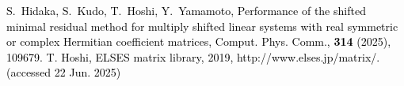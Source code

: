 


\textcolor{black}{
\fontsize{28pt}{15pt}\selectfont
\begin{thebibliography}{7}
	\vspace{-2mm}
		S.~Hidaka, S.~Kudo, T.~Hoshi, Y.~Yamamoto,
		Performance of the shifted minimal residual method for multiply shifted linear systems with real symmetric or complex Hermitian coefficient matrices,
		Comput. Phys. Comm., \textbf{314} (2025), 109679.
		T. Hoshi, ELSES matrix library, 2019, http://www.elses.jp/matrix/. (accessed 22 Jun. 2025)
\end{thebibliography}
}


\begin{comment}




	\bibitem{ref-SeitoH-2019}
		S.~Hiroaki, T.~Hoshi, and Y.~Yamamoto,
		\newblock On using the shifted minimal residual method for quantum-mechanical wave packet simulation,
		\newblock JSIAM Let., {\bf 11} (2019), 13--16.
	\bibitem{ref-SogabeT-2010}
		S.~Tomohiro et.al.,
		\newblock A fast numerical method for generalized shifted linear systems with complex symmetric matrices,
		\newblock 数理解析研究所講究録., {\bf 1719} (2010), 106--117.


\end{comment}
